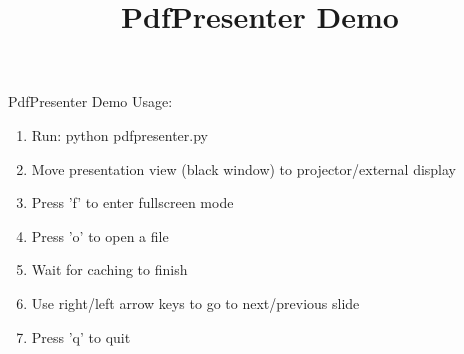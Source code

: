 \documentclass{beamer}
\title{PdfPresenter Demo}
\begin{document}
\begin{frame}{PdfPresenter Demo}
Usage:
\begin{enumerate}
	\item Run: python pdfpresenter.py
	\item Move presentation view (black window) to projector/external display
	\item Press 'f' to enter fullscreen mode
	\item Press 'o' to open a file
	\item Wait for caching to finish
	\item Use right/left arrow keys to go to next/previous slide
	\item Press 'q' to quit
\end{enumerate}
\end{frame}
\end{document}
